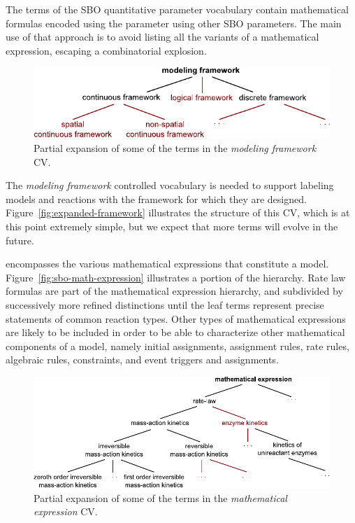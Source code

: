\begin{blockChanged}

The terms of the SBO quantitative parameter vocabulary contain
mathematical formulas encoded using \mathmltwo
{} the parameter using other SBO parameters.  The
main use of that approach is to avoid listing all the variants of a
mathematical expression, escaping a combinatorial explosion.

\end{blockChanged}

\begin{figure}[tbh]
  \vspace*{1ex}
  \centering
  \includegraphics[scale = 0.9]{figs/sbo-framework}
  \vspace*{-2ex}
  \caption{Partial expansion of some of the terms in the
    \emph{modeling framework} CV.}
  \label{fig:expanded-framework}
\end{figure}


The \emph{modeling framework} controlled vocabulary is needed to
support labeling models and reactions with the framework for which
they are designed.  Figure~\vref{fig:expanded-framework}
illustrates the structure of this CV, which is at this point
extremely simple, but we expect that more terms will evolve in the
future.

 encompasses the
various mathematical expressions that constitute a model.
Figure~\vref{fig:sbo-math-expression} illustrates a portion of the
hierarchy.  Rate law formulas are part of the mathematical
expression hierarchy, and subdivided by successively more refined
distinctions until the leaf terms represent precise statements of
common reaction types.  Other types of mathematical expressions
are likely to be included  in order to be
able to characterize other mathematical components of a model,
namely initial assignments, assignment rules, rate rules,
algebraic rules, constraints, and event triggers and assignments.

\begin{figure}[tbh]
  \centering
  \includegraphics[scale = 0.9]{figs/sbo-math-expression}
  \caption{Partial expansion of some of the terms in the \emph{mathematical
      expression} CV.}
  \label{fig:sbo-math-expression}
\end{figure}

